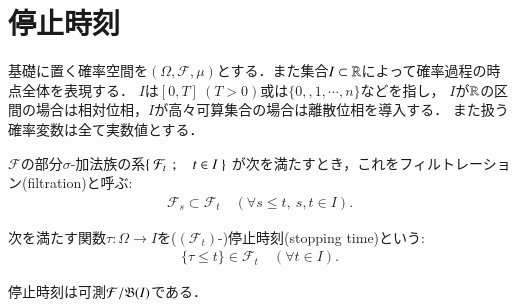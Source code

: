 \section{停止時刻}
	基礎に置く確率空間を$(\Omega,\mathcal{F},\mu)$とする．また集合$I \subset \mathbb{R}$によって確率過程の時点全体を表現する．
	$I$は$[0,T]\ (T > 0)$或は$\{0,,1,\cdots,n\}$などを指し，
	$I$が$\mathbb{R}$の区間の場合は相対位相，$I$が高々可算集合の場合は離散位相を導入する．
	また扱う確率変数は全て実数値とする．
	\begin{screen}
		\begin{dfn}[フィルトレーション]
			$\mathcal{F}$の部分$\sigma$-加法族の系$\left\{\ \mathcal{F}_t\ \, ; \quad t \in I\ \right\}$
			が次を満たすとき，これをフィルトレーション(filtration)と呼ぶ:
			\begin{align}
				\mathcal{F}_s \subset \mathcal{F}_t
				\quad (\forall s \leq t,\ s,t \in I).
			\end{align}
		\end{dfn}
	\end{screen}
	
	\begin{screen}
		\begin{dfn}[停止時刻]
			次を満たす関数$\tau:\Omega \rightarrow I$を($(\mathcal{F}_t)$-)停止時刻(stopping time)という:
			\begin{align}
				\{ \tau \leq t \} \in \mathcal{F}_t \quad (\forall t \in I).
			\end{align}
		\end{dfn}
	\end{screen}
	
	\begin{screen}
		\begin{rem}[停止時刻は可測写像]
			停止時刻は可測$\mathcal{F}/\mathfrak{B}(I)$である．
		\end{rem}
	\end{screen}
	
